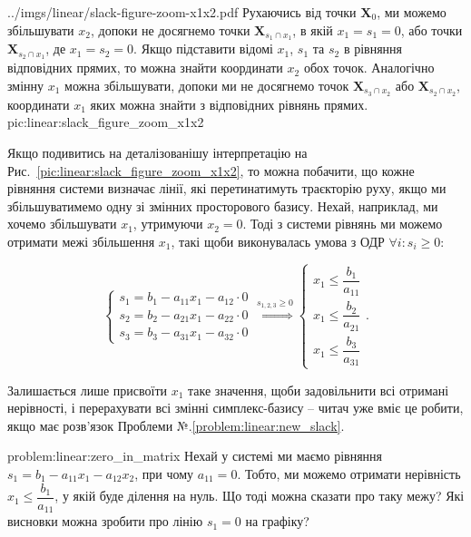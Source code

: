 \documentclass[\main/book.tex]{subfiles}
\begin{document}
\illustration
 {../imgs/linear/slack-figure-zoom-x1x2.pdf}
 {Рухаючись від точки $\mathbf{X}_0$, ми можемо збільшувати $x_2$, допоки не досягнемо точки $\mathbf{X}_{s_1 \cap x_1}$, в якій $x_1 = s_1 = 0$, або точки $\mathbf{X}_{s_2 \cap x_1}$, де $x_1 = s_2 = 0$. Якщо підставити відомі $x_1$, $s_1$ та $s_2$ в рівняння відповідних прямих, то можна знайти координати $x_2$ обох точок. Аналогічно змінну $x_1$ можна збільшувати, допоки ми не досягнемо точок $\mathbf{X}_{s_3 \cap x_2}$ або $\mathbf{X}_{s_2 \cap x_2}$, координати $x_1$ яких можна знайти з відповідних рівнянь прямих.}
 {pic:linear:slack_figure_zoom_x1x2}

Якщо подивитись на деталізованішу інтерпретацію на Рис.~\ref{pic:linear:slack_figure_zoom_x1x2}, то можна побачити, що кожне рівняння системи визначає лінії, які перетинатимуть траєкторію руху, якщо ми збільшуватимемо одну зі змінних просторового базису. Нехай, наприклад, ми хочемо збільшувати $x_1$, утримуючи $x_2 = 0$. Тоді з системи рівнянь ми можемо отримати межі збільшення $x_1$, такі щоби виконувалась умова з ОДР $\forall i: s_i \geq 0$:

\[
\left\{\begin{array}{l}
  s_1 = b_1 - a_{11} x_1 - a_{12} \cdot 0 \\
  s_2 = b_2 - a_{21} x_1 - a_{22} \cdot 0 \\
  s_3 = b_3 - a_{31} x_1 - a_{32} \cdot 0
\end{array}\right.
\overset{s_{1, 2, 3} \geq 0}{\Rightarrow}
\left\{\begin{array}{l}
  x_1 \leq \dfrac{b_1}{a_{11}} \\[4pt]
  x_1 \leq \dfrac{b_2}{a_{21}} \\[4pt]
  x_1 \leq \dfrac{b_3}{a_{31}}
\end{array}\right..
\]



Залишається лише присвоїти $x_1$ таке значення, щоби задовільнити всі отримані нерівності, і перерахувати всі змінні симплекс-базису -- читач уже вміє це робити, якщо має розв'язок Проблеми №.\ref{problem:linear:new_slack}.

\begin{problem}{problem:linear:zero_in_matrix}
 Нехай у системі ми маємо рівняння $s_1 = b_1 - a_{11} x_1 - a_{12} x_2$, при чому $a_{11} = 0$. Тобто, ми можемо отримати нерівність $x_1 \leq \dfrac{b_1}{a_{11}}$, у якій буде ділення на нуль. Що тоді можна сказати про таку межу? Які висновки можна зробити про лінію $s_1 = 0$ на графіку?
\end{problem}
\end{document}
